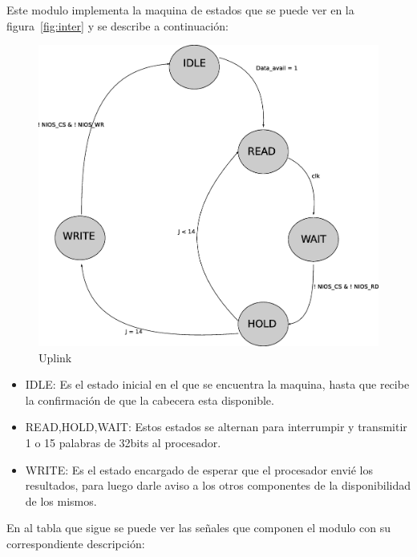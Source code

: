 Este modulo implementa la maquina de estados que se puede ver en la figura~\ref{fig:inter} y se describe a continuación:

\begin{figure}[H]
  \centering
	\includegraphics[scale=0.45]{3-arquitectura/graf/estuplinkcompleto.eps}
  \caption{Uplink}
  \label{fig:estuplink}
\end{figure}

\begin{itemize}
	\item IDLE: Es el estado inicial en el que se encuentra la maquina, hasta que recibe la confirmación de que la cabecera esta disponible.
	\item READ,HOLD,WAIT: Estos estados se alternan para interrumpir y transmitir 1 o 15 palabras de 32bits al procesador.
	\item WRITE: Es el estado encargado de esperar que el procesador envié los resultados, para luego darle aviso a los otros componentes de la disponibilidad de los mismos.
\end{itemize}

En al tabla que sigue se puede ver las señales que componen el modulo con su correspondiente descripción:

